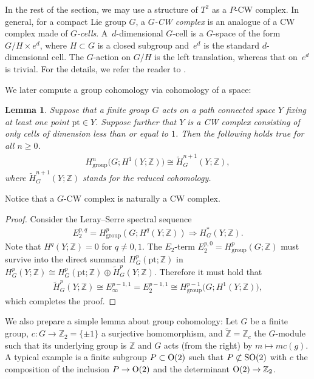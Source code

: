 \documentclass[pdftex]{sigma}
\newtheorem{lem}[thm]{Lemma}
\theoremstyle{definition}
\newcommand{\Z}{\mathbb{Z}}
\newcommand{\pt}{\mathrm{pt}}
\begin{document}
In the rest of the section, we may use a structure of $T^2$ as a $P$-CW complex. In general, for a compact Lie group $G$, a \textit{$G$-CW complex} is an analogue of a CW complex made of \textit{$G$-cells}. A~$d$-dimensional $G$-cell is a $G$-space of the form $G/H \times e^d$, where $H \subset G$ is a closed subgroup and~$e^d$ is the standard $d$-dimensional cell. The $G$-action on $G/H$ is the left translation, whereas that on~$e^d$ is trivial. For the details, we refer the reader to \cite{May}.

We later compute a group cohomology via cohomology of a space:

\begin{lem} \label{lem:1_dim_complex}
Suppose that a finite group $G$ acts on a path connected space $Y$ fixing at least one point $\pt \in Y$. Suppose further that $Y$ is a CW complex consisting of only cells of dimension less than or equal to $1$. Then the following holds true for all $n \ge 0$.
\begin{gather*}
H^n_{\mathrm{group}}\big(G; H^1(Y; \Z)\big) \cong \tilde{H}^{n+1}_G(Y; \Z),
\end{gather*}
where $\tilde{H}^{n+1}_G(Y; \Z)$ stands for the reduced cohomology.
\end{lem}

Notice that a $G$-CW complex is naturally a CW complex.

\begin{proof}
Consider the Leray--Serre spectral sequence
\begin{gather*}
E_2^{p, q} = H^p_{\mathrm{group}}(G; H^q(Y; \Z))\Longrightarrow H^*_G(Y; \Z).
\end{gather*}
Note that $H^q(Y; \Z) = 0$ for $q \neq 0, 1$. The $E_2$-term $E_2^{p, 0} = H^p_{\mathrm{group}}(G; \Z)$ must survive into the direct summand $H^p_G(\pt; \Z)$ in $H^p_G(Y; \Z) \cong H^p_G(\pt; \Z) \oplus \tilde{H}^p_G(Y; \Z)$. Therefore it must hold that
\begin{gather*}
\tilde{H}^p_G(Y; \Z) \cong E^{p-1, 1}_\infty = E^{p-1, 1}_2\cong H^{p-1}_{\mathrm{group}}\big(G; H^1(Y; \Z)\big),
\end{gather*}
which completes the proof.
\end{proof}

We also prepare a simple lemma about group cohomology: Let $G$ be a f\/inite group, $c \colon G \to \Z_2 = \{ \pm 1 \}$ a surjective homomorphism, and $\tilde{\Z} = \Z_c$ the $G$-module such that its underlying group is $\Z$ and $G$ acts (from the right) by $m \mapsto m c(g)$. A typical example is a f\/inite subgroup $P \subset {\rm O}(2)$ such that $P \not\subset {\rm SO}(2)$ with $c$ the composition of the inclusion $P \to {\rm O}(2)$ and the determinant ${\rm O}(2) \to \Z_2$.
\end{document}
